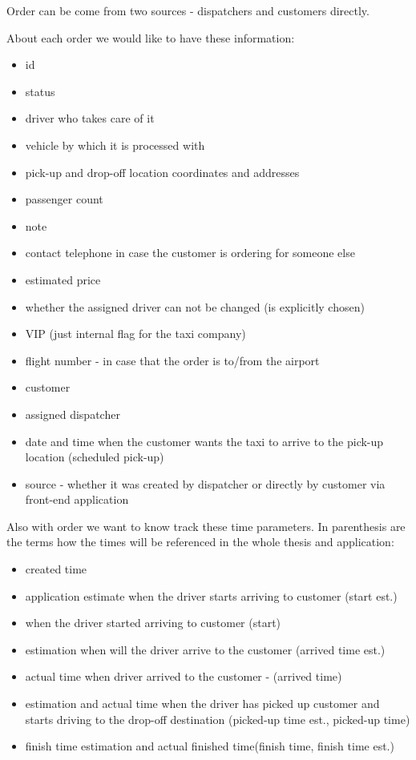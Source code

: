 	 	Order can be come from two sources - dispatchers and customers directly.
	 	
	 	About each order we would like to have these information:
		
		\begin{itemize}
			\item id
			\item status 
			\item driver who takes care of it
			\item vehicle by which it is processed with
			\item pick-up and drop-off location coordinates and addresses
			\item passenger count
			\item note
			\item contact telephone in case the customer is ordering for someone else
			\item estimated price
			\item whether the assigned driver can not be changed (is explicitly chosen)
			\item VIP (just internal flag for the taxi company)
			\item flight number - in case that the order is to/from the airport
			\item customer
			\item assigned dispatcher
			\item date and time when the customer wants the taxi to arrive to the pick-up location (scheduled pick-up)
			\item source - whether it was created by dispatcher or directly by customer via front-end application
		\end{itemize}
		Also with order we want to know track these time parameters. In parenthesis are the terms how the times will be referenced in the whole thesis and application:
		\begin{itemize}
			\item created time
			\item application estimate when the driver starts arriving to customer (start est.)
			\item when the driver started arriving to customer (start)
			\item estimation when will the driver arrive to the customer (arrived time est.)
			\item actual time when driver arrived to the customer - (arrived time)
			\item estimation and actual time when the driver has picked up  customer and starts driving to the drop-off destination (picked-up time est., picked-up time)
			\item finish time estimation and actual finished time(finish time, finish time est.)
		\end{itemize}
	
